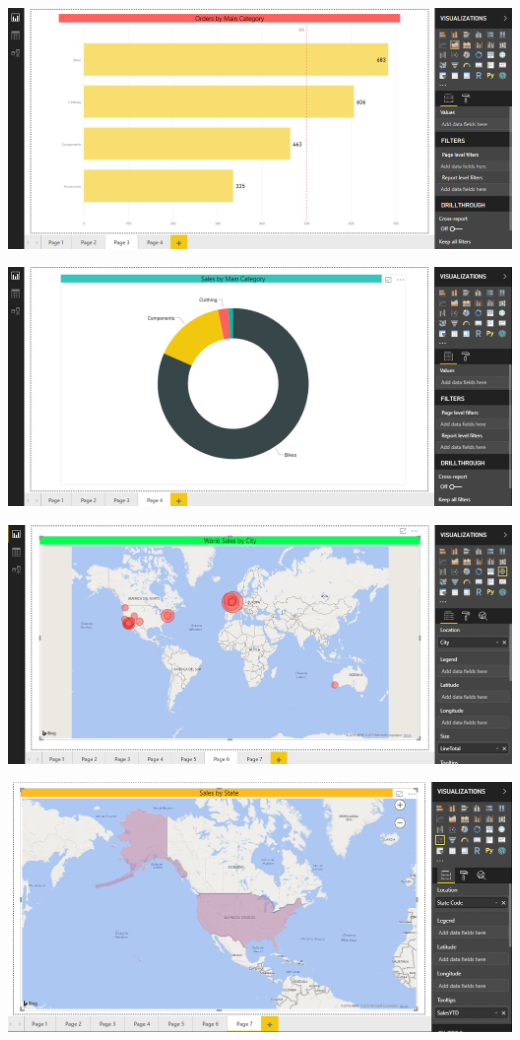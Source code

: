 	\begin{center}
	\includegraphics[width=15cm]{./images/power24}
	\end{center}	

	\begin{center}
	\includegraphics[width=15cm]{./images/power25}
	\end{center}	

	\begin{center}
	\includegraphics[width=15cm]{./images/power26}
	\end{center}	

	\begin{center}
	\includegraphics[width=15cm]{./images/power27}
	\end{center}	

